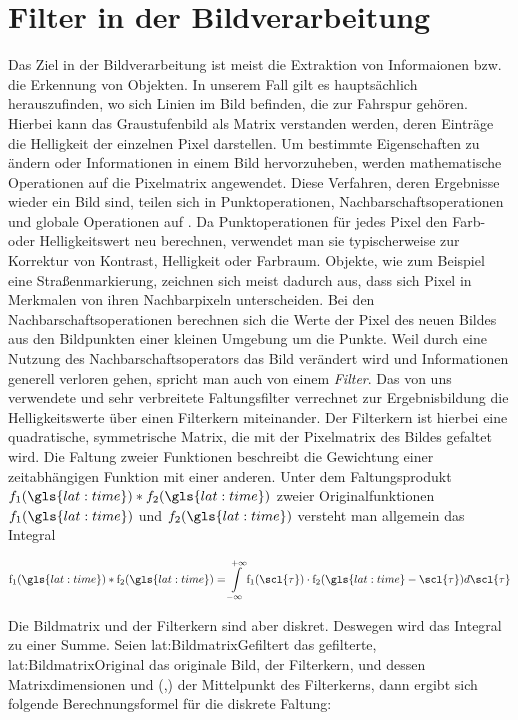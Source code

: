 \section{Filter in der Bildverarbeitung} \label{sec:filter}

Das Ziel in der Bildverarbeitung ist meist die Extraktion von Informaionen bzw. die Erkennung von Objekten. In unserem Fall gilt es hauptsächlich herauszufinden, wo sich Linien im Bild befinden, die zur Fahrspur gehören. Hierbei kann das Graustufenbild als Matrix verstanden werden, deren Einträge die Helligkeit der einzelnen Pixel darstellen. Um bestimmte Eigenschaften zu ändern oder Informationen in einem Bild hervorzuheben, werden mathematische Operationen auf die Pixelmatrix angewendet. Diese Verfahren, deren Ergebnisse wieder ein Bild sind, teilen sich in Punktoperationen, Nachbarschaftsoperationen und globale Operationen auf \autocite{jaehneDigitaleBildverarbeitungMit2005}. Da Punktoperationen für jedes Pixel den Farb- oder Helligkeitswert neu berechnen, verwendet man sie typischerweise zur Korrektur von Kontrast, Helligkeit oder Farbraum. Objekte, wie zum Beispiel eine Straßenmarkierung, zeichnen sich meist dadurch aus, dass sich Pixel in Merkmalen von ihren Nachbarpixeln unterscheiden. Bei den Nachbarschaftsoperationen berechnen sich die Werte der Pixel des neuen Bildes aus den Bildpunkten einer kleinen Umgebung um die Punkte. Weil durch eine Nutzung des Nachbarschaftsoperators das Bild verändert wird und Informationen generell verloren gehen, spricht man auch von einem \emph{Filter}. Das von uns verwendete und sehr verbreitete Faltungsfilter verrechnet zur Ergebnisbildung die Helligkeitswerte über einen Filterkern miteinander. Der Filterkern ist hierbei eine quadratische, symmetrische Matrix, die mit der Pixelmatrix des Bildes gefaltet wird. Die Faltung zweier Funktionen beschreibt die Gewichtung einer zeitabhängigen Funktion mit einer anderen. Unter dem Faltungsprodukt \( f_1(\gls{lat:time}) \ast f_2(\gls{lat:time}) \) zweier Originalfunktionen \(f_1(\gls{lat:time}) \) und \(f_2(\gls{lat:time}) \) versteht man allgemein das Integral \autocite{papulaMathematikFuerIngenieure}

\begin{equation}
\mathrm{f_1}(\gls{lat:time}) \ast \mathrm{f_2}(\gls{lat:time}) = \int \limits_{-\infty}^{+\infty} \mathrm{f_1}(\scl{\tau}) \cdot \mathrm{f_2}(\gls{lat:time}-\scl{\tau})d\scl{\tau}
\end{equation}

 Die Bildmatrix und der Filterkern sind aber diskret. Deswegen wird das Integral zu einer Summe. Seien \gls{lat:BildmatrixGefiltert} das gefilterte, \gls{lat:BildmatrixOriginal} das originale Bild,  der Filterkern,  und  dessen Matrixdimensionen und (,) der Mittelpunkt des Filterkerns, dann ergibt sich folgende Berechnungsformel für die diskrete Faltung:


